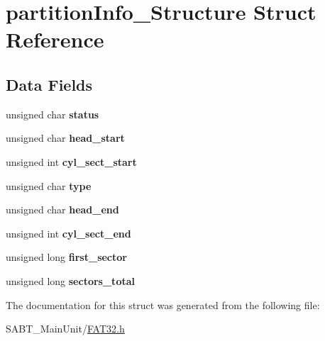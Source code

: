 \hypertarget{structpartition_info___structure}{\section{partition\-Info\-\_\-\-Structure Struct Reference}
\label{structpartition_info___structure}
}
\subsection*{Data Fields}
\begin{DoxyCompactItemize}
\item 
\hypertarget{structpartition_info___structure_a54849a1c58ce64ba16a055ad9555a027}{unsigned char {\bfseries status}}\label{structpartition_info___structure_a54849a1c58ce64ba16a055ad9555a027}

\item 
\hypertarget{structpartition_info___structure_aa469ade944b503d78dfe4298d01d48bd}{unsigned char {\bfseries head\-\_\-start}}\label{structpartition_info___structure_aa469ade944b503d78dfe4298d01d48bd}

\item 
\hypertarget{structpartition_info___structure_aa34963fd352a4d49d74f67186108e520}{unsigned int {\bfseries cyl\-\_\-sect\-\_\-start}}\label{structpartition_info___structure_aa34963fd352a4d49d74f67186108e520}

\item 
\hypertarget{structpartition_info___structure_aa5044999f3339d2ba3b1bf22fa6cfe95}{unsigned char {\bfseries type}}\label{structpartition_info___structure_aa5044999f3339d2ba3b1bf22fa6cfe95}

\item 
\hypertarget{structpartition_info___structure_a70c700ab626666a60d1be2e70405facc}{unsigned char {\bfseries head\-\_\-end}}\label{structpartition_info___structure_a70c700ab626666a60d1be2e70405facc}

\item 
\hypertarget{structpartition_info___structure_a03c5e95ba25a27cb32786e4d98f6f200}{unsigned int {\bfseries cyl\-\_\-sect\-\_\-end}}\label{structpartition_info___structure_a03c5e95ba25a27cb32786e4d98f6f200}

\item 
\hypertarget{structpartition_info___structure_a6feeb91e3b0b0ef776a7ab45ca0c6e80}{unsigned long {\bfseries first\-\_\-sector}}\label{structpartition_info___structure_a6feeb91e3b0b0ef776a7ab45ca0c6e80}

\item 
\hypertarget{structpartition_info___structure_af05284a035e1865ad2edac8ad92322b5}{unsigned long {\bfseries sectors\-\_\-total}}\label{structpartition_info___structure_af05284a035e1865ad2edac8ad92322b5}

\end{DoxyCompactItemize}


The documentation for this struct was generated from the following file\-:\begin{DoxyCompactItemize}
\item 
S\-A\-B\-T\-\_\-\-Main\-Unit/\hyperlink{_f_a_t32_8h}{F\-A\-T32.\-h}\end{DoxyCompactItemize}
